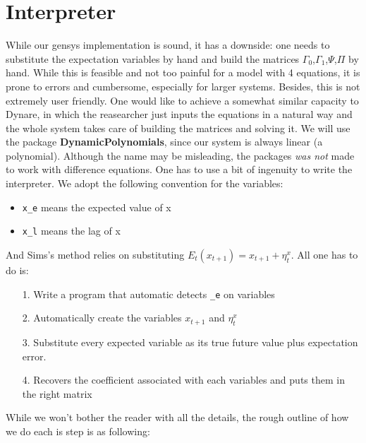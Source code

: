 \documentclass[12pt,a4paper]{article}
\begin{document}
\section{Interpreter}
While our gensys implementation is sound, it has a downside: one needs to substitute the expectation variables by hand and build the matrices $\Gamma_0$,$\Gamma_1$,$\Psi$,$\Pi$ by hand. While this is feasible and not too painful for a model with 4 equations, it is prone to errors and cumbersome, especially for larger systems. Besides, this is not extremely user friendly. One would like to achieve a somewhat similar capacity to Dynare, in which the reasearcher just inputs the equations in a natural way and the whole system takes care of building the matrices and solving it. We will use the package \textbf{DynamicPolynomials}, since our system is always linear (a polynomial). Although the name may be misleading, the packages \emph{was not} made to work with difference equations. One has to use a bit of ingenuity to write the interpreter. We adopt the following convention for the variables:

\begin{itemize}
\item \texttt{x\_e} means the expected value of x


\item \texttt{x\_l} means the lag of x

\end{itemize}
And Sims's method relies on substituting $E_t(x_{t+1}) = x_{t+1} + \eta_t^{x}$. All one has to do is:

\begin{itemize}
\item[1. ] Write a program that automatic detects \texttt{\_e} on variables


\item[2. ] Automatically create the variables $x_{t+1}$ and $\eta_t^x$


\item[3. ] Substitute every expected variable as its true future value plus expectation error.


\item[4. ] Recovers the coefficient associated with each variables and puts them in the right matrix

\end{itemize}
While we won't bother the reader with all the details, the rough outline of how we do each is step is as following:
\end{document}
